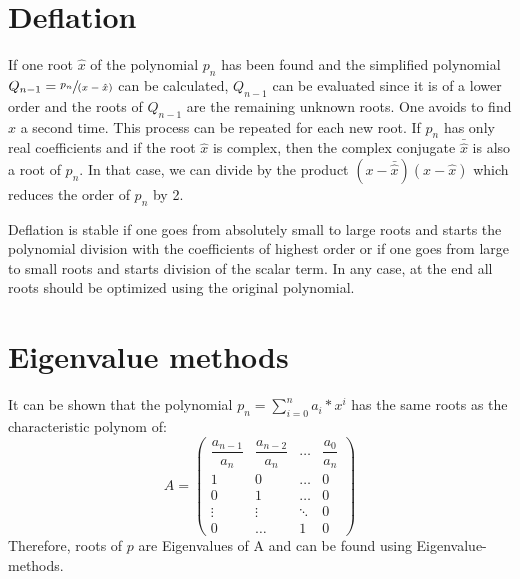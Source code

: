 \section{Deflation}\label{sec:deflation}
If one root $\hat{x}$ of the polynomial $p_n$ has been found and the simplified polynomial
$Q_{n-1}= \sfrac{p_n}{(x-\hat{x})}$ can be calculated,
$Q_{n-1}$ can be evaluated since it is of a lower order and the roots of $Q_{n-1}$ are the remaining unknown roots.
One avoids to find $\hat{x}$ a second time.
This process can be repeated for each new root.
If $p_n$ has only real coefficients and if the root $\hat{x}$ is complex, then the complex
conjugate  $\bar{\hat{x}}$ is also a root of $p_n$.
In that case, we can divide by the product $(x-\bar{\hat{x}})(x-\hat{x})$ which
reduces the order of $p_n$ by 2.

Deflation is stable if one goes from absolutely small to large roots and starts
the polynomial division with the coefficients of highest order or if one goes
from large to small roots and starts division of the scalar term.
In any case, at the end all roots should be optimized using the original polynomial.

\section{Eigenvalue methods}\label{sec:eigenvalue-methods}
It can be shown that the polynomial $p_n = \sum_{i=0}^{n}a_i*x^i$ has the same roots as the characteristic polynom of:
\begin{equation*}
    A=
    \begin{pmatrix}
        \dfrac{a_{n-1}}{a_n} & \dfrac{a_{n-2}}{a_n} &\dots & \dfrac{a_0}{a_n}\\[0.9em]
        1 & 0 & \dots & 0\\[0.5em]
        0 & 1 & \dots & 0\\[0.5em]
        \vdots & \vdots &\ddots &0 \\[0.5em]
        0 &  \dots & 1 & 0
    \end{pmatrix}
\end{equation*}
Therefore, roots of $p$ are Eigenvalues of A and can be found using Eigenvalue-methods.


